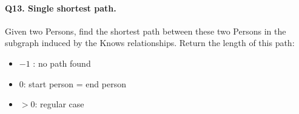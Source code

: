 \paragraph{\textbf{Q13}. Single shortest path.}
Given two Persons, find the shortest path between these two Persons in
the subgraph induced by the Knows relationships.
Return the length of this path:
\begin{itemize}
\tightlist
\item
  \(-1\) : no path found
\item
  \(0\): start person = end person
\item
  \(> 0\): regular case
\end{itemize}
